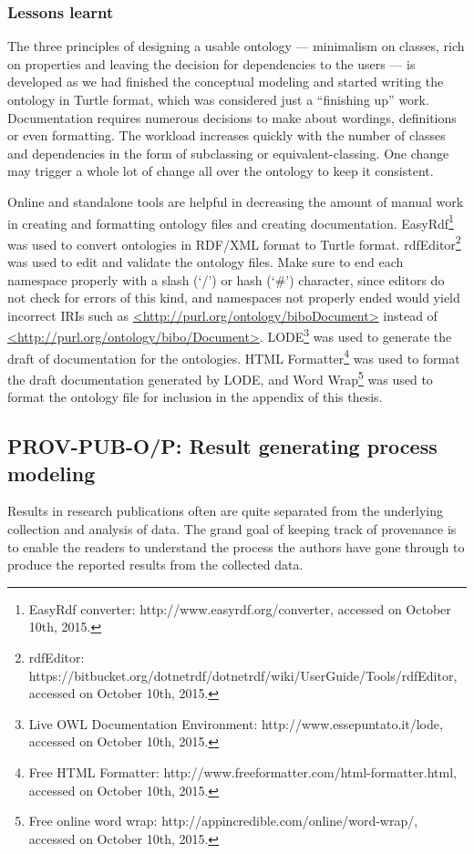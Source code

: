 \subsubsection{Lessons learnt}
The three principles of designing a usable ontology --- minimalism on classes, rich on properties and leaving the decision for dependencies to the users --- is developed as we had finished the conceptual modeling and started writing the ontology in Turtle format, which was considered just a ``finishing up'' work. Documentation requires numerous decisions to make about wordings, definitions or even formatting. The workload increases quickly with the number of classes and dependencies in the form of subclassing or equivalent-classing. One change may trigger a whole lot of change all over the ontology to keep it consistent.

Online and standalone tools are helpful in decreasing the amount of manual work in creating and formatting ontology files and creating documentation. EasyRdf\footnote{EasyRdf converter: http://www.easyrdf.org/converter, accessed on October 10th, 2015.} was used to convert ontologies in RDF/XML format to Turtle format. rdfEditor\footnote{rdfEditor: https://bitbucket.org/dotnetrdf/dotnetrdf/wiki/UserGuide/Tools/rdfEditor, accessed on October 10th, 2015.} was used to edit and validate the ontology files. Make sure to end each namespace properly with a slash (`/') or hash (`\#') character, since editors do not check for errors of this kind, and namespaces not properly ended would yield incorrect IRIs such as \url{<http://purl.org/ontology/biboDocument>} instead of \url{<http://purl.org/ontology/bibo/Document>}. LODE\footnote{Live OWL Documentation Environment: http://www.essepuntato.it/lode, accessed on October 10th, 2015.} was used to generate the draft of documentation for the ontologies. HTML Formatter\footnote{Free HTML Formatter: http://www.freeformatter.com/html-formatter.html, accessed on October 10th, 2015.} was used to format the draft documentation generated by LODE, and Word Wrap\footnote{Free online word wrap: http://appincredible.com/online/word-wrap/, accessed on October 10th, 2015.} was used to format the ontology file for inclusion in the appendix of this thesis.


\subsection{PROV-PUB-O/P: Result generating process modeling}
\label{subsec:process}
Results in research publications often are quite separated from the underlying collection and analysis of data. The grand goal of keeping track of provenance is to enable the readers to understand the process the authors have gone through to produce the reported results from the collected data.

